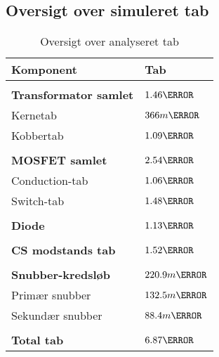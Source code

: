 \subsection{Oversigt over simuleret tab}
\begin{table}[H] 			
	\centering
	\begin{tabularx}{\textwidth}{|X|l|}
		\hline
		\textbf{\large Komponent} & \textbf{\large Tab} \\ \hline
		&  	\\ \hline
		\textbf{Transformator samlet} & $1.46\watt$  	\\ \hline 
		Kernetab & $366m\watt$  						\\ \hline
		Kobbertab & $1.09\watt$  						\\ \hline
		& 	\\ \hline
		\textbf{MOSFET samlet} & $2.54\watt$  			\\ \hline
		Conduction-tab & $1.06\watt$  					\\ \hline
		Switch-tab & $1.48\watt$  						\\ \hline
		& 	\\ \hline
		\textbf{Diode} & $1.13\watt$  					\\ \hline
		& 	\\ \hline
		\textbf{CS modstands tab} & $1.52\watt$  		\\ \hline
		& 	\\ \hline
		\textbf{Snubber-kredsløb} & $220.9m\watt$  		\\ \hline
		Primær snubber	& $132.5m\watt$					\\ \hline
		Sekundær snubber &	$88.4m\watt$ 				\\ \hline
		& 	\\ \hline
		\textbf{Total tab} & $6.87\watt$ 		 		\\ \hline
	\end{tabularx}
	\caption{Oversigt over analyseret tab}
	\label{tab:analyse_tab_3}
\end{table}
 